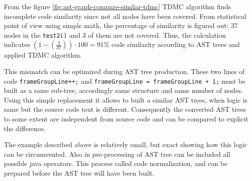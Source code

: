 \documentclass{report}
\begin{document}
From the figure \ref{fig:ast-graph-compare-similar-tdmc} TDMC algorithm finds incomplete code similarity since not all nodes have been covered. From statistical point of view using simple math, the percentage of similarity is figured out: 37 nodes in the \texttt{test2()} and 3 of them are not covered. Thus, the calculation indicates  $\left ( 1 - \left (\frac{3}{37} \right ) \right )\cdot 100 = 91\%$ code similarity according to AST trees and applied TDMC algorithm.

This mismatch can be optimized during AST tree production. These two lines of code \texttt{frameGroupLine++;} and \texttt{frameGroupLine = frameGroupLine + 1;}
must be built as a same sub-tree, accordingly same structure and same number of nodes. Using this simple replacement it allows to built a similar AST trees, when logic is same but the source code text is different. Consequently the converted AST trees to some extent are independent from source code and can be compared to explicit the difference.

The example described above is relatively small, but exact showing how this logic can be circumvented. Also in pre-processing of AST tree can be included all possible java operators. This process called code normalization, and can be prepared before the AST tree will have been built. \\
\end{document}
